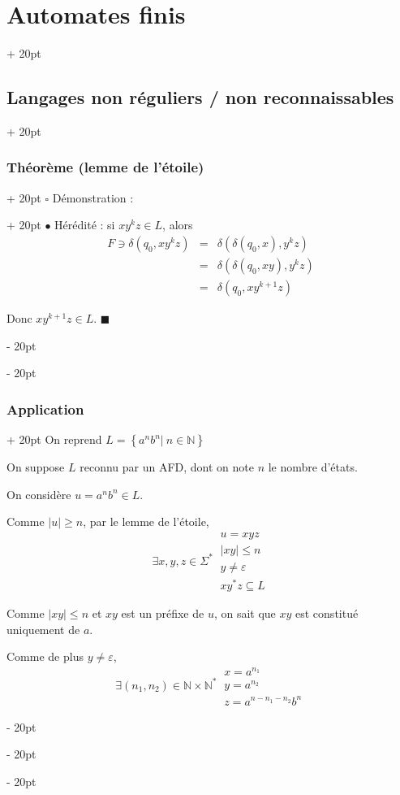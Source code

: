 \documentclass[a4paper, 12pt, twoside]{article}
\newcommand{\N}{\mathbb{N}} %
\newcommand{\set}[1]{\left\{ #1 \right\}}
\newcommand{\abs}[1]{\left\lvert #1 \right\rvert}
\renewcommand{\le}{\leqslant}
\renewcommand{\ge}{\geqslant}
\newcommand{\ind}[1][20pt]{\advance\leftskip + #1}
\newcommand{\deind}[1][20pt]{\advance\leftskip - #1}
\newenvironment{indt}[2][20pt]{#2 \par \ind[#1]}{\par \deind} %
\newenvironment{proof}[1][{Démonstration :}]{\begin{indt}{$\square$ #1}}{$\blacksquare$ \end{indt}}
\begin{document}
\begin{indt}{\section{Automates finis}}
\begin{indt}{\subsection{Langages non réguliers / non reconnaissables}}
\begin{indt}{\subsubsection{Théorème (lemme de l'étoile)}}
\begin{proof}
                    $\bullet$ Hérédité : si $xy^k z \in L$, alors
                    \[
                        \begin{array}{rcl}
                            F \ni \delta(q_0, xy^k z)
                            &=& \delta(\delta(q_0, x), y^kz)
                            \\
                            &=& \delta(\delta(q_0, xy), y^kz)
                            \\
                            &=& \delta(q_0, xy^{k + 1}z)
                        \end{array}
                    \]

                    Donc $xy^{k + 1}z \in L$.
                \end{proof}
            \end{indt}

            \vspace{12pt}
            
            \begin{indt}{\subsubsection{Application}}
                On reprend $L = \set{a^n b^n |\ n \in \N}$

                On suppose $L$ reconnu par un AFD, dont on note $n$ le nombre d'états.

                On considère $u = a^n b^n \in L$.

                Comme $\abs u \ge n$, par le lemme de l'étoile,
                \[
                    \exists x, y, z \in \Sigma^*\
                    \begin{array}{|l}
                        u = xyz
                        \\
                        \abs{xy} \le n
                        \\
                        y \neq \varepsilon
                        \\
                        xy^*z \subseteq L
                    \end{array}
                \]

                Comme $\abs{xy} \le n$ et $xy$ est un préfixe de $u$, on sait que $xy$ est constitué uniquement de $a$.

                Comme de plus $y \neq \varepsilon$,
                \[
                    \exists (n_1, n_2) \in \N \times \N^*\
                    \begin{array}{|l}
                        x = a^{n_1}
                        \\
                        y = a^{n_2}
                        \\
                        z = a^{n - n_1 - n_2}b^n
                    \end{array}
                \]


\end{indt}
\end{indt}
\end{indt}
\end{document}
